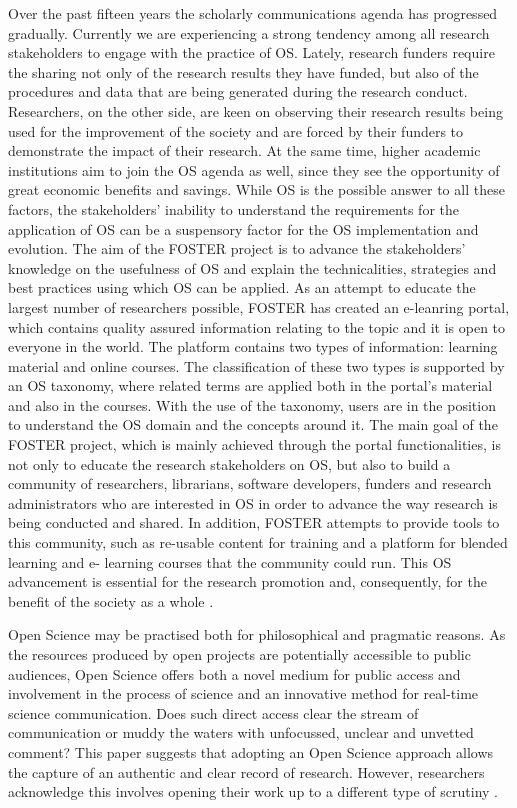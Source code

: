 
Over the past fifteen years the scholarly communications agenda
has progressed gradually. Currently we are experiencing a strong
tendency among all research stakeholders to engage with the
practice of OS. Lately, research funders require the sharing not
only of the research results they have funded, but also of the
procedures and data that are being generated during the research
conduct. Researchers, on the other side, are keen on observing
their research results being used for the improvement of the
society and are forced by their funders to demonstrate the impact
of their research. At the same time, higher academic institutions
aim to join the OS agenda as well, since they see the opportunity
of great economic benefits and savings. While OS is the possible
answer to all these factors, the stakeholders’ inability to
understand the requirements for the application of OS can be a
suspensory factor for the OS implementation and evolution.
The aim of the FOSTER project is to advance the stakeholders'
knowledge on the usefulness of OS and explain the technicalities,
strategies and best practices using which OS can be applied. As an
attempt to educate the largest number of researchers possible,
FOSTER has created an e-leanring portal, which contains quality
assured information relating to the topic and it is open to everyone
in the world. The platform contains two types of information:
learning material and online courses. The classification of these
two types is supported by an OS taxonomy, where related terms
are applied both in the portal's material and also in the courses.
With the use of the taxonomy, users are in the position to
understand the OS domain and the concepts around it.
The main goal of the FOSTER project, which is mainly achieved
through the portal functionalities, is not only to educate the
research stakeholders on OS, but also to build a community of
researchers, librarians, software developers, funders and research
administrators who are interested in OS in order to advance the
way research is being conducted and shared. In addition, FOSTER
attempts to provide tools to this community, such as re-usable
content for training and a platform for blended learning and e-
learning courses that the community could run. This OS
advancement is essential for the research promotion and,
consequently, for the benefit of the society as a whole
\cite{Nancy2015}.

Open Science may be practised both
for philosophical and pragmatic reasons. As the
resources produced by open projects are
potentially accessible to public audiences, Open
Science offers both a novel medium for public
access and involvement in the process of science
and an innovative method for real-time science
communication. Does such direct access clear
the stream of communication or muddy the
waters with unfocussed, unclear and unvetted
comment? This paper suggests that adopting an
Open Science approach allows the capture of an
authentic and clear record of research.
However, researchers acknowledge this involves
opening their work up to a different type of
scrutiny \cite{Grand2010}.

